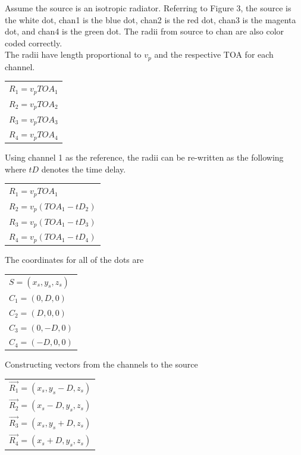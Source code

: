 \documentclass[12pt]{article}
\begin{document}
\pagebreak
\noindent Assume the source is an isotropic radiator. Referring to Figure 3, the source is the white dot, chan1 is the blue dot, chan2 is the red dot, chan3 is the magenta dot, and chan4 is the green dot. The radii from source to chan are also color coded correctly.\\

\noindent The radii have length proportional to $v_p$ and the respective TOA for each channel.

\begin{center}
\begin{tabular}{l}
$R_1 = v_p TOA_1$\\
$R_2 = v_p TOA_2$\\
$R_3 = v_p TOA_3$\\
$R_4 = v_p TOA_4$\\
\end{tabular}
\end{center}

\noindent Using channel 1 as the reference, the radii can be re-written as the following where $tD$ denotes the time delay.

\begin{center}
\begin{tabular}{l}
$R_1 = v_p TOA_1$\\
$R_2 = v_p (TOA_1 - tD_2)$\\
$R_3 = v_p (TOA_1 - tD_3)$\\
$R_4 = v_p (TOA_1 - tD_4)$\\
\end{tabular}
\end{center}

\noindent The coordinates for all of the dots are

\begin{center}
\begin{tabular}{l}
$S = (x_s,y_s,z_s)$\\
$C_1 = (0,D,0)$\\
$C_2 = (D,0,0)$\\
$C_3 = (0,-D,0)$\\
$C_4 = (-D,0,0)$\\
\end{tabular}
\end{center}

\noindent Constructing vectors from the channels to the source

\begin{center}
\begin{tabular}{l}
$\overrightarrow{R_1} = (x_s,y_s-D,z_s)$\\
$\overrightarrow{R_2} = (x_s-D,y_s,z_s)$\\
$\overrightarrow{R_3} = (x_s,y_s+D,z_s)$\\
$\overrightarrow{R_4} = (x_s+D,y_s,z_s)$\\
\end{tabular}
\end{center}
\end{document}
